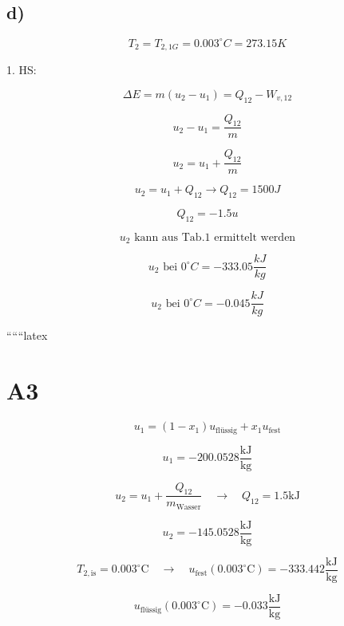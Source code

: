 

\subsection*{d)}
\[
T_2 = T_{2,1G} = 0.003^\circ C = 273.15K
\]

1. HS:

\[
\Delta E = m(u_2 - u_1) = Q_{12} - W_{v,12}
\]

\[
u_2 - u_1 = \frac{Q_{12}}{m}
\]

\[
u_2 = u_1 + \frac{Q_{12}}{m}
\]

\[
u_2 = u_1 + Q_{12} \rightarrow Q_{12} = 1500J
\]

\[
Q_{12} = -1.5u
\]

\[
u_2 \text{ kann aus Tab.1 ermittelt werden}
\]

\[
u_2 \text{ bei } 0^\circ C = -333.05 \frac{kJ}{kg}
\]

\[
u_2 \text{ bei } 0^\circ C = -0.045 \frac{kJ}{kg}
\]

``````latex

\section*{A3}

\begin{equation*}
u_1 = (1 - x_1) u_{\text{flüssig}} + x_1 u_{\text{fest}}
\end{equation*}

\begin{equation*}
u_1 = -200.0528 \frac{\text{kJ}}{\text{kg}}
\end{equation*}

\begin{equation*}
u_2 = u_1 + \frac{Q_{12}}{m_{\text{Wasser}}} \quad \rightarrow \quad Q_{12} = 1.5 \text{kJ}
\end{equation*}

\begin{equation*}
u_2 = -145.0528 \frac{\text{kJ}}{\text{kg}}
\end{equation*}

\begin{equation*}
T_{2, \text{is}} = 0.003^\circ \text{C} \quad \rightarrow \quad u_{\text{fest}} (0.003^\circ \text{C}) = -333.442 \frac{\text{kJ}}{\text{kg}}
\end{equation*}

\begin{equation*}
u_{\text{flüssig}} (0.003^\circ \text{C}) = -0.033 \frac{\text{kJ}}{\text{kg}}
\end{equation*}


